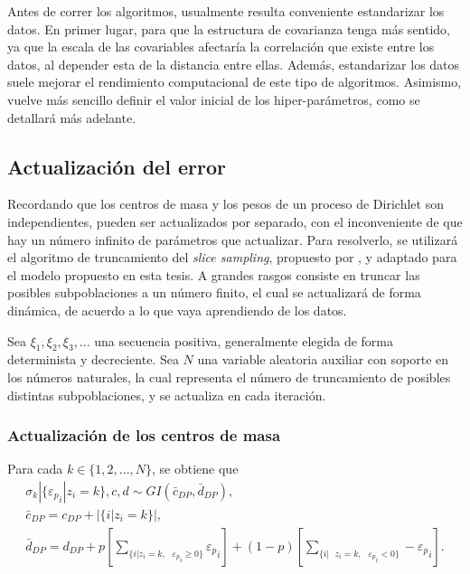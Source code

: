 Antes de correr los algoritmos, usualmente resulta conveniente estandarizar los datos. En primer lugar, para que la estructura de covarianza tenga más sentido, ya que la escala de las covariables afectaría la correlación que existe entre los datos, al depender esta de la distancia entre ellas. Además, estandarizar los datos suele mejorar el rendimiento computacional de este tipo de algoritmos. Asimismo, vuelve m\'as sencillo definir el valor inicial de los hiper-par\'ametros, como se detallar\'a m\'as adelante.

\subsection{Actualizaci\'on del error}

Recordando que los centros de masa y los pesos de un proceso de Dirichlet son independientes, pueden ser actualizados por separado, con el inconveniente de que hay un n\'umero infinito de par\'ametros que actualizar. Para resolverlo, se utilizará el algoritmo de truncamiento del \textit{slice sampling}, propuesto por \cite{Kalli_Slice}, y adaptado para el modelo propuesto en esta tesis. A grandes rasgos consiste en truncar las posibles subpoblaciones a un número finito, el cual se actualizar\'a de forma din\'amica, de acuerdo a lo que vaya aprendiendo de los datos. 

Sea $\xi_1,\xi_2,\xi_3,...$ una secuencia positiva, generalmente elegida de forma determinista y decreciente. Sea $N$ una variable aleatoria auxiliar con soporte en los n\'umeros naturales, la cual representa el n\'umero de truncamiento de posibles distintas subpoblaciones, y se actualiza en cada iteraci\'on.

\subsubsection{Actualizaci\'on de los centros de masa}

Para cada $k \in \{1,2,...,N\}$, se obtiene que 
\begin{equation*}
\begin{gathered}
    \sigma_k | \{{\varepsilon_p}_i| z_i = k\}, c, d \sim GI(\bar{c}_{DP}, \bar{d}_{DP}),\\
    \bar{c}_{DP} = c_{DP} + |\{i| z_i = k\}|, \\
    \bar{d}_{DP} = d_{DP} 
    + p \left[\sum_{\{i| z_i = k,\text{ }{\varepsilon_p}_i \geq 0\}} {\varepsilon_p}_i\right]
    + (1-p) \left[\sum_{\{i| \text{ } z_i = k,\text{ }{\varepsilon_p}_i < 0\}}  -{\varepsilon_p}_i\right].
\end{gathered}
\end{equation*}


